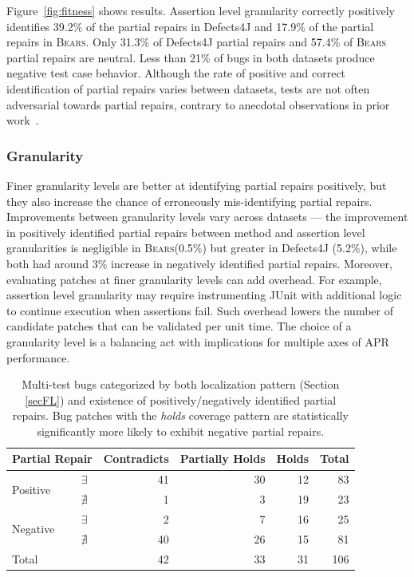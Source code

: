 \documentclass[10pt,journal,compsoc]{IEEEtran}
\newcommand\bears{\textsc{Bears}\xspace}
\begin{document}
Figure~\ref{fig:fitness} shows results.
Assertion level granularity correctly positively identifies
39.2\% of the partial repairs in Defects4J
and 17.9\% of the partial repairs in \bears.
Only 31.3\% of Defects4J partial repairs and 
57.4\% 
of \bears partial repairs are neutral. Less than 21\% of bugs in both datasets
produce negative test case behavior.
Although the rate of positive and correct identification of partial repairs varies between datasets,
tests are not often adversarial towards partial repairs, contrary to anecdotal
observations in prior work~\cite{gecco09}.

\subsubsection{Granularity} Finer granularity levels are better at identifying partial repairs positively,
but they also increase the chance of erroneously mis-identifying partial repairs.
Improvements between granularity levels vary across datasets --- the improvement 
in positively identified partial repairs between method and assertion level granularities
is negligible in \bears (0.5\%) but greater in Defects4J (5.2\%), while both had around 3\% 
increase in negatively identified partial repairs.
Moreover, evaluating patches at finer granularity levels can add overhead.
For example, assertion level granularity may require instrumenting JUnit with additional
logic to continue execution when assertions fail.
Such overhead lowers the number of
candidate patches that can be validated per unit time.
The choice of a granularity level is a balancing act with implications for
multiple axes of APR performance.


\begin{table}
  {\begin{center}
      \begin{tabular} {llrrrr}
        \toprule
        \multicolumn{2}{c}{Partial Repair} & Contradicts & Partially Holds & Holds & Total \\
        \midrule
        \multirow{2}{*}{Positive} & $\exists$  & 41 & 30 & 12 &  83 \\
                                  & $\nexists$ &  1 &  3 & 19 &  23 \\
        \midrule
        \multirow{2}{*}{Negative} & $\exists$  &  2 &  7 & 16 &  25 \\
                                  & $\nexists$ & 40 & 26 & 15 &  81 \\
        \midrule
        Total                     &            & 42 & 33 & 31 & 106 \\
        \bottomrule
      \end{tabular}
    \end{center}
  }
  \caption{\small Multi-test bugs categorized by both localization pattern
    (Section \ref{secFL}) and existence of positively/negatively identified
    partial repairs. Bug patches with the \emph{holds} coverage pattern are
    statistically significantly more likely to exhibit negative partial
    repairs.  \label{tab:cov_fitness}}
\end{table}
\end{document}
